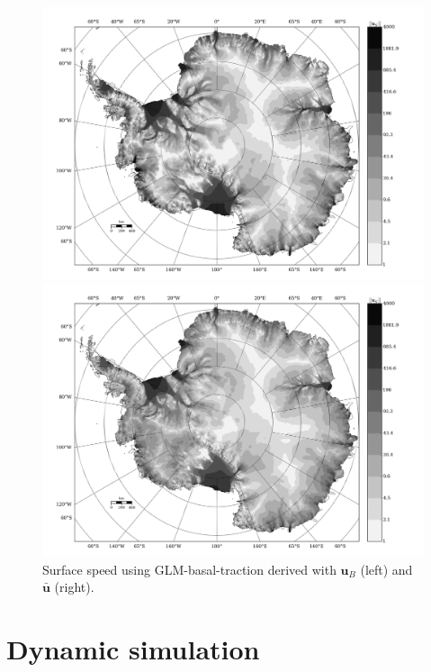 \begin{figure}
  \centering
  \begin{minipage}[b]{0.47\linewidth}
    \includegraphics[width=1.0\textwidth]{images/antarctica/stats/GLM_Us_U.jpg}
  \end{minipage}
  \quad
  \begin{minipage}[b]{0.47\linewidth}
    \includegraphics[width=1.0\textwidth]{images/antarctica/stats/GLM_Us_Ubar.jpg}
  \end{minipage}
  \caption[]{Surface speed using GLM-basal-traction derived with $\mathbf{u}_B$ (left) and $\mathbf{\bar{u}}$ (right).}
\end{figure}


\section{Dynamic simulation}

